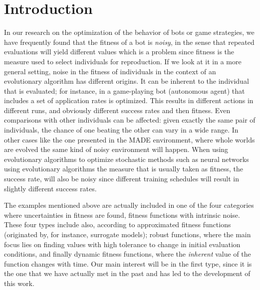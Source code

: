 \documentclass{svmult}
\begin{document}

\section{Introduction}
In our research on the optimization of the behavior of bots or game
strategies, we have frequently found that the fitness of a bot is {\em
  noisy}, in the sense that repeated evaluations will yield different
values \cite{DBLP:journals/jcst/MoraFGGF12} which is a problem since
fitness is the measure used to select individuals for reproduction. If
we look at it in a more general setting, 
noise in the fitness of individuals in the context of an evolutionary algorithm has different origins. It can be inherent to the
individual that is evaluated; for instance, in 
\cite{DBLP:journals/jcst/MoraFGGF12} a game-playing bot (autonomous agent) that includes a set of application rates is optimized. This results in different
actions in different runs, and obviously different success rates and
then fitness. Even comparisons with other individuals can be affected:
given exactly the same pair of individuals, the chance of one beating
the other can vary in a wide range. In other cases like the one
presented in the MADE environment, where whole worlds are evolved
\cite{2014arXiv1403.3084G} the same kind of noisy environment will
happen.  When using evolutionary algorithms to optimize stochastic
methods such as neural networks \cite{castilloGECCO99}
using evolutionary algorithms the measure that is usually taken as
fitness, the success rate, will also be noisy since different training
schedules will result in slightly different success rates. 

The examples mentioned above are actually included in one of the four categories
where uncertainties in fitness are found, fitness functions with intrinsic noise. These four types include also,
according to \cite{Jin2005303} approximated fitness functions
(originated by, for instance, surrogate models); robust functions,
where the main focus lies on finding values with high tolerance to
change in initial evaluation conditions, and finally dynamic fitness
functions, where the {\em inherent} value of the function changes with
time. 
Our main interest will be in the first type, since it is the one
that we have actually met in the past and has led to the development
of this work. 
\end{document}
